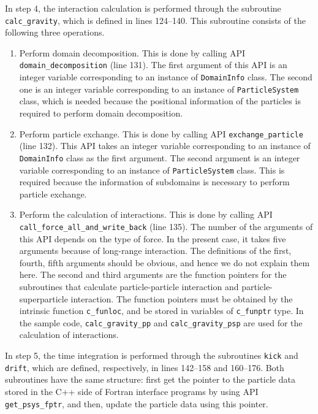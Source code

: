 \documentclass[proof,useamsfonts]{pasj01}
\begin{document}
In step 4, the interaction calculation is performed through the subroutine \texttt{calc\_gravity}, which is defined in lines 124--140. This subroutine consists of the following three operations.
\begin{enumerate}[label=(\roman*)]
\item Perform domain decomposition. This is done by calling API \texttt{domain\_decomposition} (line 131). The first argument of this API is an integer variable corresponding to an instance of \texttt{DomainInfo} class. The second one is an integer variable corresponding to an instance of \texttt{ParticleSystem} class, which is needed because the positional information of the particles is required to perform domain decomposition.  
\item Perform particle exchange. This is done by calling API \texttt{exchange\_particle} (line 132). This API takes an integer variable corresponding to an instance of \texttt{DomainInfo} class as the first argument. The second argument is an integer variable corresponding to an instance of \texttt{ParticleSystem} class. This is required because the information of subdomains is necessary to perform particle exchange.
\item Perform the calculation of interactions. This is done by calling API \texttt{call\_force\_all\_and\_write\_back} (line 135). The number of the arguments of this API depends on the type of force. In the present case, it takes five arguments because of long-range interaction. The definitions of the first, fourth, fifth arguments should be obvious, and hence we do not explain them here. The second and third arguments are the function pointers for the subroutines that calculate particle-particle interaction and particle-superparticle interaction. The function pointers must be obtained by the intrinsic function \texttt{c\_funloc}, and be stored in variables of \texttt{c\_funptr} type. In the sample code, \texttt{calc\_gravity\_pp} and \texttt{calc\_gravity\_psp} are used for the calculation of interactions.
\end{enumerate}


In step 5, the time integration is performed through the subroutines \texttt{kick} and \texttt{drift}, which are defined, respectively, in lines 142--158 and 160--176. Both subroutines have the same structure: first get the pointer to the particle data stored in the C++ side of Fortran interface programs by using API \texttt{get\_psys\_fptr}, and then, update the particle data using this pointer.
\end{document}
